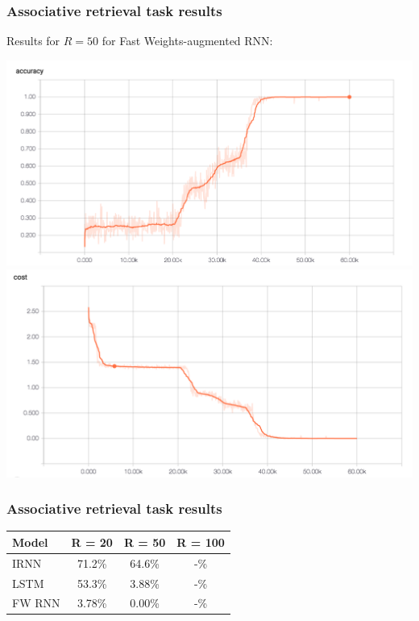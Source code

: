 \documentclass{beamer}
\begin{document}
\begin{frame}
  \frametitle{Associative retrieval task results}

  Results for $R = 50$ for Fast Weights-augmented RNN:
  \begin{center}
  \includegraphics[scale=0.20]{../final/images/fast_weight_r_50_accuracy.png} \\
  \includegraphics[scale=0.20]{../final/images/fast_weight_r_50_cost.png}
  \end{center}
\end{frame}

\begin{frame}
  \frametitle{Associative retrieval task results}
  \begin{center}
    \begin{tabular}{lccc}
      Model & R = 20 & R = 50 & R = 100 \\
      \hline
      IRNN & 71.2\% & 64.6\% & -\% \\
      LSTM & 53.3\% & 3.88\% & -\% \\
      FW RNN & 3.78\% & 0.00\% & -\%
    \end{tabular}
  \end{center}

\end{frame}

\end{document}
